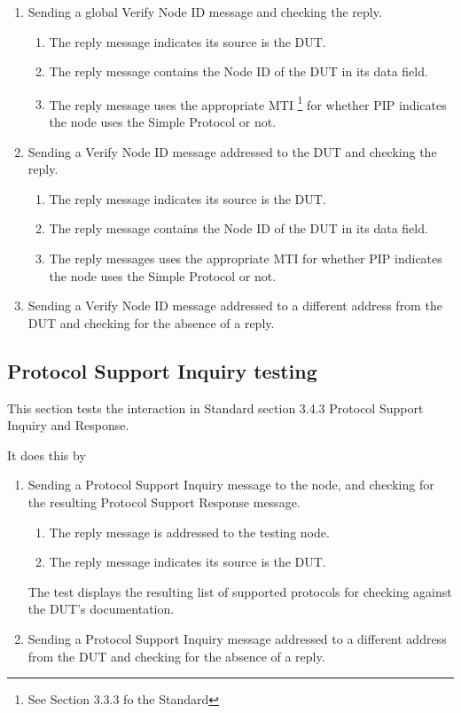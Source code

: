 \documentclass[11pt]{article}
\begin{document}
\begin{enumerate}
\item Sending a global Verify Node ID message and checking the reply.
    \begin{enumerate}
    \item The reply message indicates its source is the DUT.
    \item The reply message contains the Node ID of the DUT in its data field.
    \item The reply message uses the appropriate MTI
            \footnote{See Section 3.3.3 fo the Standard}
            for whether PIP indicates the node 
            uses the Simple Protocol or not.
    \end{enumerate}

\item Sending a Verify Node ID message addressed to the DUT and checking the reply.
    \begin{enumerate}
    \item The reply message indicates its source is the DUT.
    \item The reply message contains the Node ID of the DUT in its data field.
    \item The reply messages uses the appropriate MTI for whether PIP indicates the node 
            uses the Simple Protocol or not.
    \end{enumerate}

\item Sending a Verify Node ID message addressed to a different address from the DUT
        and checking for the absence of a reply.
\end{enumerate}

\subsection{Protocol Support Inquiry testing}

This section tests the interaction in Standard section 3.4.3 Protocol Support Inquiry and Response.

It does this by 
\begin{enumerate}
\item Sending a Protocol Support Inquiry message to the node, 
and checking for the resulting Protocol Support Response message.  
    \begin{enumerate}
    \item The reply message is addressed to the testing node.
    \item The reply message indicates its source is the DUT.
    \end{enumerate}
The test displays the resulting list of supported protocols for checking against the 
DUT's documentation.

\item Sending a Protocol Support Inquiry message addressed to a different address from the DUT
        and checking for the absence of a reply.
\end{enumerate}
\end{document}

